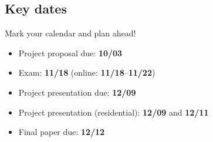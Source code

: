 \documentclass[11pt,article,oneside]{memoir} %
\begin{document}
\subsection{Key dates}\label{sub:key_dates} %

Mark your calendar and plan ahead! 

\begin{itemize}%
\item Project proposal due: \textbf{10/03}
\item Exam: \textbf{11/18} (online: \textbf{11/18}--\textbf{11/22})
\item Project presentation due: \textbf{12/09}
\item Project presentation (residential): \textbf{12/09} and \textbf{12/11}
\item Final paper due: \textbf{12/12}
\end{itemize} %



%
\end{document}
